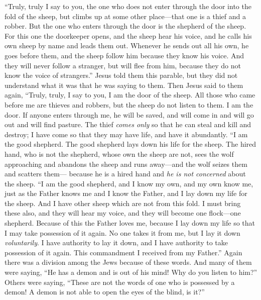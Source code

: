 \begin{biblechapter} %
 “Truly, truly I say to you, the one who does not enter through the door into the fold of the sheep, but climbs up at some other place—that one is a thief and a robber.
\verse But the one who enters through the door is the shepherd of the sheep.
\verse For this one the doorkeeper opens, and the sheep hear his voice, and he calls his own sheep by name and leads them out.
\verse Whenever he sends out all his own, he goes before them, and the sheep follow him because they know his voice.
\verse And they will never follow a stranger, but will flee from him, because they do not know the voice of strangers.”
\verse Jesus told them this parable, but they did not understand what it was that he was saying to them.
\verse Then Jesus said to them again, “Truly, truly, I say to you, I am the door of the sheep.
\verse All those who came before me are thieves and robbers, but the sheep do not listen to them.
\verse I am the door. If anyone enters through me, he will be saved, and will come in and will go out and will find pasture.
\verse The thief \textit{comes only} so that he can steal and kill and destroy; I have come so that they may have life, and have it abundantly.
\verse “I am the good shepherd. The good shepherd lays down his life for the sheep.
\verse The hired hand, who is not the shepherd, whose own the sheep are not, sees the wolf approaching and abandons the sheep and runs away—and the wolf seizes them and scatters them—
\verse because he is a hired hand and \textit{he is not concerned} about the sheep.
\verse “I am the good shepherd, and I know my own, and my own know me,
\verse just as the Father knows me and I know the Father, and I lay down my life for the sheep.
\verse And I have other sheep which are not from this fold. I must bring these also, and they will hear my voice, and they will become one flock—one shepherd.
\verse Because of this the Father loves me, because I lay down my life so that I may take possession of it again.
\verse No one takes it from me, but I lay it down \textit{voluntarily}. I have authority to lay it down, and I have authority to take possession of it again. This commandment I received from my Father.”
\verse Again there was a division among the Jews because of these words.
\verse And many of them were saying, “He has a demon and is out of his mind! Why do you listen to him?”
\verse Others were saying, “These are not the words of one who is possessed by a demon! A demon is not able to open the eyes of the blind, is it?”

\end{biblechapter}
